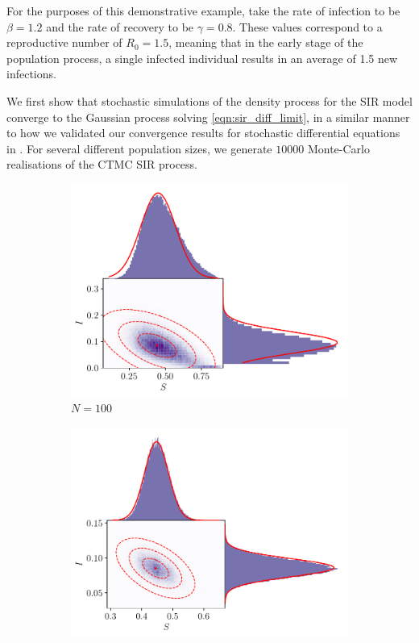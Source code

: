 For the purposes of this demonstrative example, take the rate of infection to be \(\beta = 1.2\) and the rate of recovery to be \(\gamma = 0.8\).
These values correspond to a reproductive number of \(R_0 = 1.5\), meaning that in the early stage of the population process, a single infected individual results in an average of 1.5 new infections.

We first show that stochastic simulations of the density process for the SIR model converge to the Gaussian process solving \cref{eqn:sir_diff_limit}, in a similar manner to how we validated our convergence results for stochastic differential equations in .
For several different population sizes, we generate \(10000\) Monte-Carlo realisations of the CTMC SIR process.


\begin{figure}
	\begin{center}
		\begin{subfigure}{0.49\textwidth}
			\includegraphics[width=\textwidth]{chp06_applications/figures/sir/sir_pairwise_100}
			\caption{\(N = 100\)}
		\end{subfigure}
		\begin{subfigure}{0.49\textwidth}
			\includegraphics[width=\textwidth]{chp06_applications/figures/sir/sir_pairwise_1000}

\end{subfigure}
\end{center}
\end{figure}
